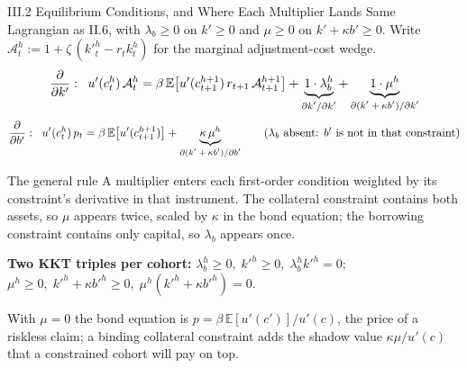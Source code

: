 \documentclass[aspectratio=169,11pt]{beamer}
\newcommand{\emphc}[1]{\textcolor{harvardcrimson}{#1}}
\newcommand{\E}[1]{\mathbb{E}\!\left[#1\right]}
\newcommand{\ubr}[2]{\underbrace{#1}_{\text{\scriptsize #2}}}
\begin{document}
\begin{frame}{III.2 Equilibrium Conditions, and Where Each Multiplier Lands}
\scriptsize
Same Lagrangian as II.6, with $\lambda_b\ge 0$ on $k'\ge 0$ and $\mu\ge 0$ on $k'+\kappa b'\ge 0$.
Write $\mathcal{A}_t^h := 1 + \zeta\,(k'^h_t - r_t k_t^h)$ for the marginal adjustment-cost wedge.
\vspace{-2pt}
\[
\frac{\partial}{\partial k'}:\;\;
u'(c_t^h)\,\mathcal{A}_t^h = \beta\,\E{u'(c_{t+1}^{h+1})\,r_{t+1}\,\mathcal{A}_{t+1}^{h+1}}
+ \ubr{1\cdot\lambda_b^h}{$\partial k'/\partial k'$} + \ubr{1\cdot\mu^h}{$\partial(k'+\kappa b')/\partial k'$}
\]
\vspace{-10pt}
\[
\frac{\partial}{\partial b'}:\;\;
u'(c_t^h)\,p_t = \beta\,\E{u'(c_{t+1}^{h+1})} + \ubr{\kappa\,\mu^h}{$\partial(k'+\kappa b')/\partial b'$}
\qquad (\lambda_b \text{ absent: } b' \text{ is not in that constraint})
\]
\vspace{-4pt}
\begin{block}{The general rule}
\vspace{-2pt}
A multiplier enters each first-order condition weighted by \emphc{its constraint's derivative in that
instrument}.  The collateral constraint contains both assets, so $\mu$ appears twice, scaled by $\kappa$
in the bond equation; the borrowing constraint contains only capital, so $\lambda_b$ appears once.
\vspace{-2pt}
\end{block}
\vspace{-3pt}
\textbf{Two KKT triples per cohort:}\;
$\lambda_b^h \ge 0,\; k'^h \ge 0,\; \lambda_b^h k'^h = 0$; \quad
$\mu^h \ge 0,\; k'^h{+}\kappa b'^h \ge 0,\; \mu^h(k'^h{+}\kappa b'^h) = 0$.

\vspace{-1pt}
{\scriptsize With $\mu = 0$ the bond equation is $p = \beta\,\mathbb{E}[u'(c')]/u'(c)$, the price of a riskless
claim; a binding collateral constraint adds the shadow value $\kappa\mu/u'(c)$ that a constrained cohort
will pay on top.}
\end{frame}
\end{document}
